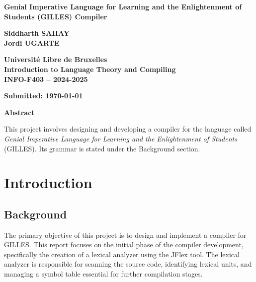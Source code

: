 \documentclass{article}
\begin{document}
	
	\begin{titlepage}
		\centering
		\vspace*{2cm}
		
		\Huge
		\textbf{Genial Imperative Language for Learning and the Enlightenment of Students (GILLES) Compiler}
		
		\vspace{1.5cm}
		
		\Large
		\textbf{Siddharth SAHAY} \\
		\textbf{Jordi UGARTE}		
		
		\vfill
		
		\Large
		\textbf{Université Libre de Bruxelles} \\
		\textbf{Introduction to Language Theory and Compiling} \\
		\textbf{INFO-F403 – 2024-2025}
		
		\vspace{0.8cm}
		
		\large
		\textbf{Submitted: \today}
		
		\vfill
	\end{titlepage}

	\tableofcontents
	\newpage
	\vspace*{\fill}
	\begin{center}
		\textbf{\LARGE Abstract} %
	\end{center}

	\begin{center}
		This project involves designing and developing a compiler for the language called \textit{Genial Imperative Language for Learning and the Enlightenment of Students} (GILLES). Its grammar is stated under the Background section.
	\end{center}
	\vspace*{\fill}


	\newpage
	
	\section{Introduction}
	\subsection{Background}
	The primary objective of this project is to design and implement a compiler for GILLES. This report focuses on the initial phase of the compiler development, specifically the creation of a lexical analyzer using the JFlex tool. The lexical analyzer is responsible for scanning the source code, identifying lexical units, and managing a symbol table essential for further compilation stages.
\end{document}
